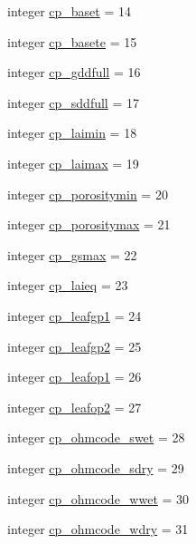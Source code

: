 \begin{DoxyCompactItemize}
integer \hyperlink{namespacecolnamesinputfiles_aa6e8702ebc154e97146143ca01742cde}{cp\+\_\+baset} = 14
\item 
integer \hyperlink{namespacecolnamesinputfiles_a582abac43ac49e891a2878897f233d3b}{cp\+\_\+basete} = 15
\item 
integer \hyperlink{namespacecolnamesinputfiles_adec15ce8b05af8e73e70f6b580302216}{cp\+\_\+gddfull} = 16
\item 
integer \hyperlink{namespacecolnamesinputfiles_a8ababcab7676d23c4e8d33b9f8e01054}{cp\+\_\+sddfull} = 17
\item 
integer \hyperlink{namespacecolnamesinputfiles_ac8da6b1293c69ebfd34fb7d4128a1937}{cp\+\_\+laimin} = 18
\item 
integer \hyperlink{namespacecolnamesinputfiles_a6ad16e2a1d9f4a362e883add83a2f494}{cp\+\_\+laimax} = 19
\item 
integer \hyperlink{namespacecolnamesinputfiles_a37ff540870751b79aa26de640778fe4b}{cp\+\_\+porositymin} = 20
\item 
integer \hyperlink{namespacecolnamesinputfiles_a15109f5dcc029ed739bc985f30f555b3}{cp\+\_\+porositymax} = 21
\item 
integer \hyperlink{namespacecolnamesinputfiles_a0d5b92d88004a89290246da71f7158e6}{cp\+\_\+gsmax} = 22
\item 
integer \hyperlink{namespacecolnamesinputfiles_a895f6b4a3919ed0d2952c7d4f3952157}{cp\+\_\+laieq} = 23
\item 
integer \hyperlink{namespacecolnamesinputfiles_a159509b5d3aebdce404c1d633c77cc54}{cp\+\_\+leafgp1} = 24
\item 
integer \hyperlink{namespacecolnamesinputfiles_a394613531ccbb0e41502c17f17435c8b}{cp\+\_\+leafgp2} = 25
\item 
integer \hyperlink{namespacecolnamesinputfiles_a67a5fa87c0166fbdc3010b66754ebe05}{cp\+\_\+leafop1} = 26
\item 
integer \hyperlink{namespacecolnamesinputfiles_a2fe4a932f4a108d334a97a126858d0f9}{cp\+\_\+leafop2} = 27
\item 
integer \hyperlink{namespacecolnamesinputfiles_adfd708c99602ed3e4eb07b89fbf62318}{cp\+\_\+ohmcode\+\_\+swet} = 28
\item 
integer \hyperlink{namespacecolnamesinputfiles_aff9e0357ee213040201012147abcecac}{cp\+\_\+ohmcode\+\_\+sdry} = 29
\item 
integer \hyperlink{namespacecolnamesinputfiles_a92936eff685e2832c5c41afed024b7b9}{cp\+\_\+ohmcode\+\_\+wwet} = 30
\item 
integer \hyperlink{namespacecolnamesinputfiles_aaaa9971efe84bc6052765ab7ce221748}{cp\+\_\+ohmcode\+\_\+wdry} = 31

\end{DoxyCompactItemize}
